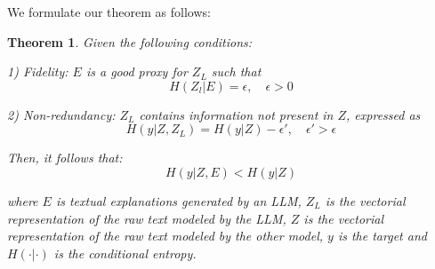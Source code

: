 \documentclass{article}
\newtheorem{theorem}{Theorem}
\begin{document}
We formulate our theorem as follows:
\begin{theorem}
Given the following conditions: 

1) Fidelity: $E$ is a good proxy for $Z_L$ such that
\begin{equation}
    H(Z_l | E)=\epsilon, {\quad \epsilon>0}
\end{equation}

2) Non-redundancy: $Z_L$ contains information not present in $Z$, expressed as
\begin{equation}
    H(y| Z, Z_L) = H(y|Z) - \epsilon', \quad \epsilon'>\epsilon
\end{equation}


Then, it follows that:
\begin{equation}
H(y | Z, E) < H(y | Z)
\end{equation}

where $E$ is textual explanations generated by an LLM, $Z_L$ is the vectorial representation of the raw text modeled by the LLM, $Z$ is the vectorial representation of the raw text modeled by the other model, $y$ is the target and $H(\cdot |\cdot)$ is the conditional entropy.
\end{theorem}
\end{document}
